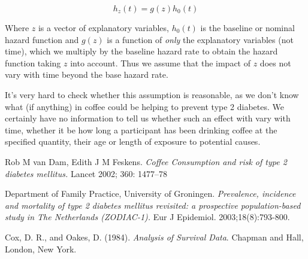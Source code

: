 \documentclass{article}
\begin{document}
\begin{equation}
h_{z}(t) = g(z)h_{0}(t)
\end{equation}

Where \(z\) is a vector of explanatory variables, \(h_{0}(t)\) is the
baseline or nominal hazard function and \(g(z)\) is a function of
\emph{only} the explanatory variables (not time), which we multiply by
the baseline hazard rate to obtain the hazard function taking \(z\)
into account. Thus we assume that the impact of \(z\) does not vary
with time beyond the base hazard rate.

It's very hard to check whether this assumption is reasonable, as we
don't know what (if anything) in coffee could be helping to prevent
type 2 diabetes. We certainly have no information to tell us whether
such an effect with vary with time, whether it be how long a
participant has been drinking coffee at the specified quantity, their
age or length of exposure to potential causes.



\begin{thebibliography}{9}

Rob M van Dam, Edith J M Feskens.
\textit{Coffee Consumption and risk of type 2 diabetes mellitus.}
Lancet 2002; 360: 1477–78

Department of Family Practice, University of Groningen.
\emph{Prevalence, incidence and mortality of type 2 diabetes mellitus
revisited: a prospective population-based study in The Netherlands
(ZODIAC-1).}
Eur J Epidemiol. 2003;18(8):793-800.

Cox, D. R., and Oakes, D. (1984).
\emph{Analysis of Survival Data}.
Chapman and Hall, London, New York.

\end{thebibliography}
\end{document}
